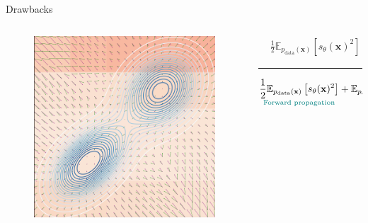 \documentclass[aspectratio=169,xcolor=dvipsnames]{beamer}
\newcommand{\bx}{\mathbf{x}}
\newcommand{\nbx}{\nabla_{\bx}}
\begin{document}
\begin{frame}{Drawbacks}
\begin{columns}
\begin{column}{0.4\textwidth}
        \begin{figure}
          \centering
        \includegraphics[height=0.32\textheight]{figs/gen/score_field_training_final}
      \end{figure}
    \end{column}
    \pause
    \begin{column}{0.6\textwidth}
      \centering
      \begin{align*}
        &\frac{1}{2}\mathbb{E}_{p_\text{data}(\bx)} \left[ s_\theta(\bx)^2\right] + \mathbb{E}_{p_\text{data}(\bx)}\left[\nbx s_\theta(\bx) \right]
      \end{align*}
      \pause
      
      \rule{0.8\textwidth}{0.4pt}
      
      \begin{align*}
        \underset{
          \textcolor{teal}{\text{Forward propagation}}
        }{ \frac{1}{2}\mathbb{E}_{p_\text{data}(\bx)} \left[ s_\theta(\bx)^2\right]} 
        + \underset{
          \textcolor{red}{\text{Backprops}~\propto~\text{dim}(\bx)}
        }{\mathbb{E}_{p_\text{data}(\bx)}\left[\text{trace}(\nbx s_\theta(\bx)) \right]}
      \end{align*}
    \end{column}
  \end{columns}
\end{frame}
\end{document}
